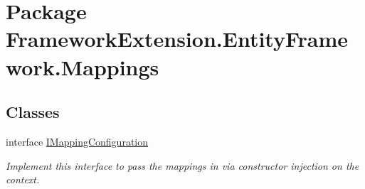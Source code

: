 \hypertarget{namespace_framework_extension_1_1_entity_framework_1_1_mappings}{\section{Package Framework\-Extension.\-Entity\-Framework.\-Mappings}
\label{namespace_framework_extension_1_1_entity_framework_1_1_mappings}
}
\subsection*{Classes}
\begin{DoxyCompactItemize}
\item 
interface \hyperlink{interface_framework_extension_1_1_entity_framework_1_1_mappings_1_1_i_mapping_configuration}{I\-Mapping\-Configuration}
\begin{DoxyCompactList}\small\item\em Implement this interface to pass the mappings in via constructor injection on the context. \end{DoxyCompactList}\end{DoxyCompactItemize}
